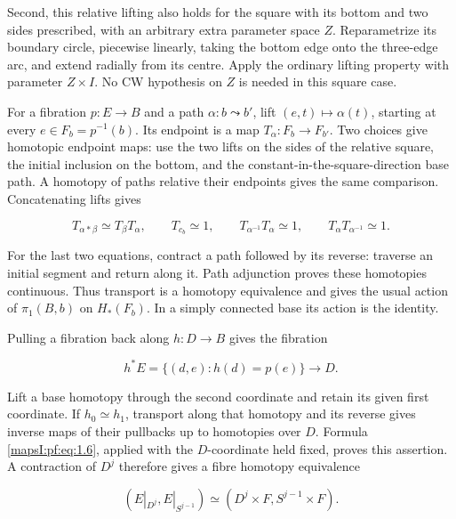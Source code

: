Second, this relative lifting also holds for the square with its bottom and two sides prescribed, with an arbitrary extra parameter space \(Z\). Reparametrize its boundary circle, piecewise linearly, taking the bottom edge onto the three-edge arc, and extend radially from its centre. Apply the ordinary lifting property with parameter \(Z\times I\). No CW hypothesis on \(Z\) is needed in this square case.

For a fibration \(p:E\to B\) and a path \(\alpha:b\leadsto b'\), lift \((e,t)\mapsto\alpha(t)\), starting at every \(e\in F_b=p^{-1}(b)\). Its endpoint is a map \(T_\alpha:F_b\to F_{b'}\). Two choices give homotopic endpoint maps: use the two lifts on the sides of the relative square, the initial inclusion on the bottom, and the constant-in-the-square-direction base path. A homotopy of paths relative their endpoints gives the same comparison. Concatenating lifts gives

\begin{equation}
T_{\alpha*\beta}\simeq T_\beta T_\alpha,\qquad
T_{c_b}\simeq1,\qquad
T_{\alpha^{-1}}T_\alpha\simeq1,\qquad
T_\alpha T_{\alpha^{-1}}\simeq1.
\label{mapsI:pf:eq:1.6}
\end{equation}

For the last two equations, contract a path followed by its reverse: traverse an initial segment and return along it. Path adjunction proves these homotopies continuous. Thus transport is a homotopy equivalence and gives the usual action of \(\pi_1(B,b)\) on \(H_*(F_b)\). In a simply connected base its action is the identity.

Pulling a fibration back along \(h:D\to B\) gives the fibration

\begin{equation}
h^*E=\{(d,e):h(d)=p(e)\}\longrightarrow D.
\label{mapsI:pf:eq:1.7}
\end{equation}

Lift a base homotopy through the second coordinate and retain its given first coordinate. If \(h_0\simeq h_1\), transport along that homotopy and its reverse gives inverse maps of their pullbacks up to homotopies over \(D\). Formula \eqref{mapsI:pf:eq:1.6}, applied with the \(D\)-coordinate held fixed, proves this assertion. A contraction of \(D^j\) therefore gives a fibre homotopy equivalence

\begin{equation}
(E|_{D^j},E|_{S^{j-1}})
\simeq(D^j\times F,S^{j-1}\times F).
\label{mapsI:pf:eq:1.8}
\end{equation}

